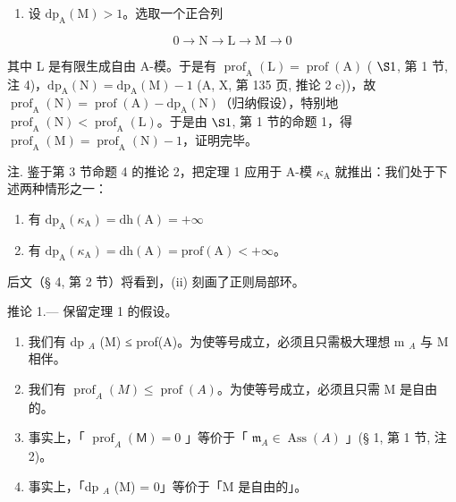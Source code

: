 \begin{enumerate}
\def\labelenumi{\alph{enumi})}
\setcounter{enumi}{2}
\tightlist
\item
  设 \(\mathrm{dp}_{\mathrm{A}}(\mathrm{M}) > 1\)。选取一个正合列
\end{enumerate}

\[
0 \to \mathrm{N} \longrightarrow \mathrm{L} \longrightarrow \mathrm{M} \to 0
\]

其中 L 是有限生成自由 A-模。于是有 \(\operatorname{prof}_{\mathrm{A}}(\mathrm{L}) = \operatorname{prof}(\mathrm{A})\) ( \(\S 1\), 第 1 节, 注 4)，\(\mathrm{dp}_{\mathrm{A}}(\mathrm{N}) = \mathrm{dp}_{\mathrm{A}}(\mathrm{M}) - 1\) (A, X, 第 135 页, 推论 2 c))，故 \(\operatorname{prof}_{\mathrm{A}}(\mathrm{N}) = \operatorname{prof}(\mathrm{A}) - \mathrm{dp}_{\mathrm{A}}(\mathrm{N})\)（归纳假设），特别地 \(\operatorname{prof}_{\mathrm{A}}(\mathrm{N}) < \operatorname{prof}_{\mathrm{A}}(\mathrm{L})\)。于是由 \(\S 1\), 第 1 节的命题 1，得 \(\operatorname{prof}_{\mathrm{A}}(\mathrm{M}) = \operatorname{prof}_{\mathrm{A}}(\mathrm{N}) - 1\)，证明完毕。

注. 鉴于第 3 节命题 4 的推论 2，把定理 1 应用于 A-模 \(\kappa_{\mathrm{A}}\) 就推出：我们处于下述两种情形之一：

\begin{enumerate}
\def\labelenumi{(\roman{enumi})}
\item
  有 \(\mathrm{dp}_{\mathrm{A}}(\kappa_{\mathrm{A}}) = \mathrm{dh}(\mathrm{A}) = +\infty\)
\item
  有 \(\mathrm{dp}_{\mathrm{A}}(\kappa_{\mathrm{A}}) = \mathrm{dh}(\mathrm{A}) = \mathrm{prof}(\mathrm{A}) < +\infty\)。
\end{enumerate}

后文（§ 4, 第 2 节）将看到，(ii) 刻画了正则局部环。

推论 1.--- 保留定理 1 的假设。

\begin{enumerate}
\def\labelenumi{\alph{enumi})}
\item
  我们有 dp \(_{A}\) (M) ≤ prof(A)。为使等号成立，必须且只需极大理想 m \(_{A}\) 与 M 相伴。
\item
  我们有 \(\operatorname{prof}_A(M) \leqslant \operatorname{prof}(A)\)。为使等号成立，必须且只需 M 是自由的。
\item
  事实上，「 \(\operatorname{prof}_{A}(\mathsf{M}) = 0\) 」等价于「 \(\mathfrak{m}_A \in \operatorname{Ass}(A)\) 」(§ 1, 第 1 节, 注 2)。
\item
  事实上，「dp \(_{A}\) (M) = 0」等价于「M 是自由的」。
\end{enumerate}

